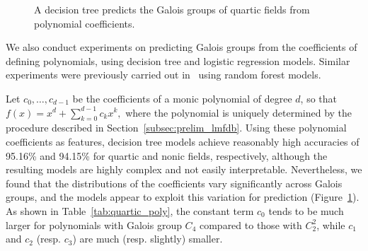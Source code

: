 \documentclass[letterpaper, 10pt]{article}
\newcommand{\1}{\mathds{1}}	%
\theoremstyle{definition}
\theoremstyle{remark}
\begin{document}
\begin{figure}[t]
    \centering
    \footnotesize
{}
    \caption{A decision tree predicts the Galois groups of quartic fields from polynomial coefficients.}
    \label{fig:quartic_poly_dt}
\end{figure}



We also conduct experiments on predicting Galois groups from the coefficients of defining polynomials, using decision tree and logistic regression models.  
Similar experiments were previously carried out in~\cite{he2022machine} using random forest models.

Let \( c_0, \dots, c_{d-1} \) be the coefficients of a monic polynomial of degree \( d \), so that \( f(x) = x^d + \sum_{k=0}^{d-1} c_k x^k, \)
where the polynomial is uniquely determined by the procedure described in Section~\ref{subsec:prelim_lmfdb}.  
Using these polynomial coefficients as features, decision tree models achieve reasonably high accuracies of  95.16\% and  94.15\% for quartic and nonic fields, respectively, although the resulting models are highly complex and not easily interpretable.
Nevertheless, we found that the distributions of the coefficients vary significantly across Galois groups, and the models appear to exploit this variation for prediction (Figure~\ref{fig:quartic_poly_dt}).  
As shown in Table~\ref{tab:quartic_poly}, the constant term \( c_0 \) tends to be much larger for polynomials with Galois group \( C_4 \) compared to those with \( C_2^2 \), while \( c_1 \) and \( c_2 \) (resp. \( c_3 \)) are much (resp. slightly) smaller.
\end{document}
